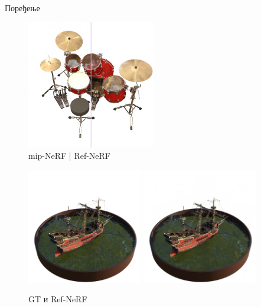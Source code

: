 \documentclass{beamer}
\begin{document}
		\begin{frame}{Поређење}
			\begin{figure}
				\centering
				\includegraphics[width=0.5\textwidth]{img/comparison/refnerf_vs_mipnerf_drums_3.png}
				\caption{mip-NeRF | Ref-NeRF}
			\end{figure}
		\end{frame}

		\begin{frame}
			\begin{figure}
				\centering
				\includegraphics[width=0.45\textwidth]{img/comparison/gt_ship_38.png}\quad
				\includegraphics[width=0.45\textwidth]{img/comparison/refnerf_ship_38.jpg}
				\caption{GT и Ref-NeRF}
			\end{figure}
		\end{frame}
\end{document}
